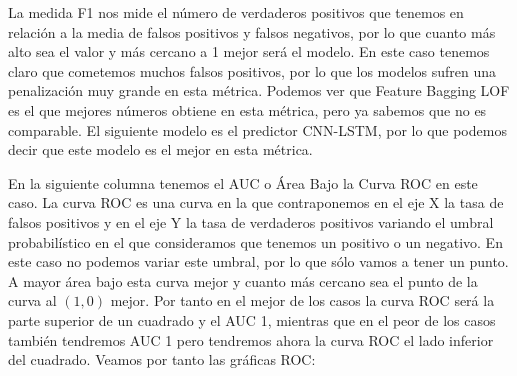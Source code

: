 La medida F1 nos mide el número de verdaderos positivos que tenemos en relación a la media de falsos positivos y falsos negativos, por lo que cuanto más alto sea el valor y más cercano a 1 mejor será el modelo. En este caso tenemos claro que cometemos muchos falsos positivos, por lo que los modelos sufren una penalización muy grande en esta métrica. Podemos ver que Feature Bagging LOF es el que mejores números obtiene en esta métrica, pero ya sabemos que no es comparable. El siguiente modelo es el predictor CNN-LSTM, por lo que podemos decir que este modelo es el mejor en esta métrica. 

En la siguiente columna tenemos el AUC o Área Bajo la Curva ROC en este caso. La curva ROC es una curva en la que contraponemos en el eje X la tasa de falsos positivos y en el eje Y la tasa de verdaderos positivos variando el umbral probabilístico en el que consideramos que tenemos un positivo o un negativo. En este caso no podemos variar este umbral, por lo que sólo vamos a tener un punto. A mayor área bajo esta curva mejor y cuanto más cercano sea el punto de la curva al $(1,0)$ mejor. Por tanto en el mejor de los casos la curva ROC será la parte superior de un cuadrado y el AUC 1, mientras que en el peor de los casos también tendremos AUC 1 pero tendremos ahora la curva ROC el lado inferior del cuadrado. Veamos por tanto las gráficas ROC:

